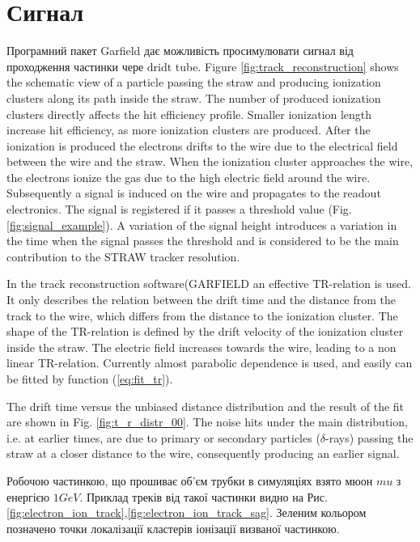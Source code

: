 \documentclass[]{article}
\begin{document}
	\section{Сигнал}	
	Програмний пакет Garfield \cite{garfield} дає можливість просимулювати сигнал від проходження частинки чере dridt tube. 
	Figure \ref{fig:track_reconstruction} shows the schematic view of a particle passing the straw and producing ionization clusters along its path inside the straw. The number of produced ionization clusters directly affects the hit efficiency profile. \cite{kozlinskiy} Smaller ionization length increase hit efficiency, as more ionization clusters are produced.  After the ionization is produced the electrons drifts to the wire due to the electrical field between the wire and the straw. When the ionization cluster approaches the wire, the electrons ionize the gas due to the high electric field around the wire.  Subsequently a signal is induced on the wire and propagates to the readout electronics. The signal is registered if it passes a threshold value (Fig. \ref{fig:signal_example}). A variation of the signal height introduces a variation in the time when the signal passes the threshold and is considered to be the main contribution to the STRAW tracker resolution. 

	In the track reconstruction software(GARFIELD \cite{garfield} an effective TR-relation is used. It only describes the relation between the drift time and the distance from the track to the wire, which differs from the distance to the ionization cluster. The shape of the TR-relation is defined by the drift velocity of the ionization cluster inside the straw. The electric field increases towards the wire, leading to a non linear TR-relation. Currently almost parabolic dependence is used, and easily can be fitted by function (\ref{eq:fit_tr}).

	The drift time versus the unbiased distance distribution and the result of the fit are shown in Fig. \ref{fig:t_r_distr_00}. The noise hits under the main distribution, i.e. at earlier times, are due to primary or secondary particles ($\delta$-rays) passing the straw at a closer distance to the wire, consequently producing an earlier signal.
	
	Робочою частинкою, що прошиває об’єм трубки в симуляціях взято мюон $mu$ з енергією $1GeV$. Приклад треків від такої частинки видно на Рис. \ref{fig:electron_ion_track},\ref{fig:electron_ion_track_sag}. Зеленим кольором позначено точки локалізації кластерів іонізації визваної частинкою.
	
\end{document}
